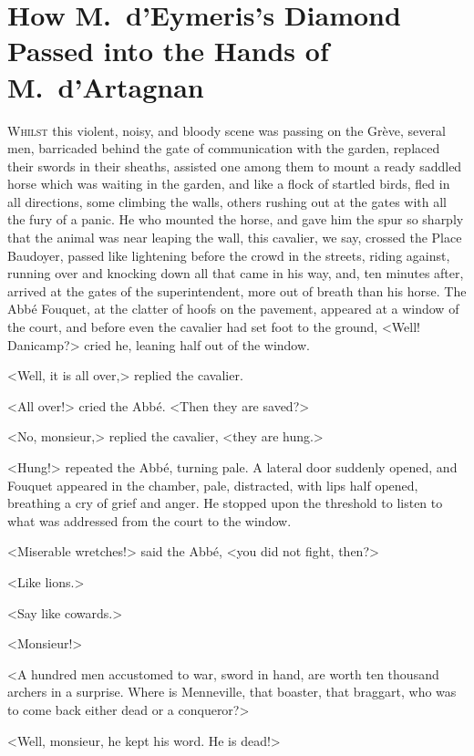 \chapter{How M.~d'Eymeris's Diamond Passed into the Hands of M.~d'Artagnan}
	

\lettrine{W}{hilst} this violent, noisy, and bloody scene was passing on the Grève, several men, barricaded behind the gate of communication with the garden, replaced their swords in their sheaths, assisted one among them to mount a ready saddled horse which was waiting in the garden, and like a flock of startled birds, fled in all directions, some climbing the walls, others rushing out at the gates with all the fury of a panic. He who mounted the horse, and gave him the spur so sharply that the animal was near leaping the wall, this cavalier, we say, crossed the Place Baudoyer, passed like lightening before the crowd in the streets, riding against, running over and knocking down all that came in his way, and, ten minutes after, arrived at the gates of the superintendent, more out of breath than his horse. The Abbé Fouquet, at the clatter of hoofs on the pavement, appeared at a window of the court, and before even the cavalier had set foot to the ground, <Well! Danicamp?> cried he, leaning half out of the window.

<Well, it is all over,> replied the cavalier.

<All over!> cried the Abbé. <Then they are saved?>

<No, monsieur,> replied the cavalier, <they are hung.>

<Hung!> repeated the Abbé, turning pale. A lateral door suddenly opened, and Fouquet appeared in the chamber, pale, distracted, with lips half opened, breathing a cry of grief and anger. He stopped upon the threshold to listen to what was addressed from the court to the window.

<Miserable wretches!> said the Abbé, <you did not fight, then?>

<Like lions.>

<Say like cowards.>

<Monsieur!>

<A hundred men accustomed to war, sword in hand, are worth ten thousand archers in a surprise. Where is Menneville, that boaster, that braggart, who was to come back either dead or a conqueror?>

<Well, monsieur, he kept his word. He is dead!>

